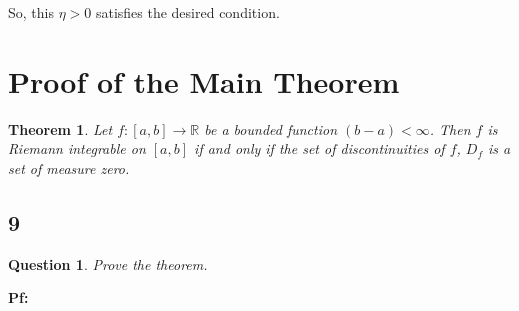 \documentclass{article}
\newtheorem{theorem}{Theorem}
\newtheorem{question}{Question}
\begin{document}
So, this $\eta>0$ satisfies the desired condition.

\break

\section*{Proof of the Main Theorem}

\begin{myBox}[]{}
    \begin{theorem}
        Let $f:[a,b]\rightarrow \mathbb{R}$ be a bounded function $(b-a)<\infty$. Then $f$ is Riemann
        integrable on $[a, b]$ if and only if the set of discontinuities of $f$, $D_f$ is a set of
        measure zero.
    \end{theorem}
\end{myBox}

\subsection*{9}
\begin{myBox2}[]{}
    \begin{question}
        Prove the theorem.
    \end{question}
\end{myBox2}

\textbf{Pf:}
\end{document}
